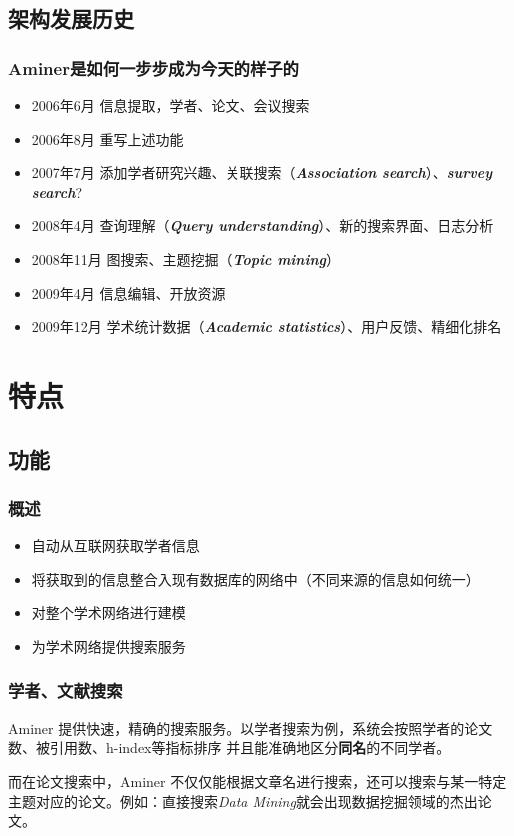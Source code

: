 \documentclass[UTF8]{ctexbeamer}
\begin{document}
\subsection{架构发展历史}
\begin{frame}
    \frametitle{Aminer是如何一步步成为今天的样子的}
    \begin{itemize}
        \item{2006年6月}
              信息提取，学者、论文、会议搜索
        \item{2006年8月}
              重写上述功能
        \item{2007年7月}
              添加学者研究兴趣、关联搜索（\textbf{\textit{Association search}}）、\textbf{\textit{survey search}}?
        \item{2008年4月}
              查询理解（\textbf{\textit{Query understanding}}）、新的搜索界面、日志分析
        \item{2008年11月}
              图搜索、主题挖掘（\textbf{\textit{Topic mining}}）
        \item{2009年4月}
              信息编辑、开放资源
        \item{2009年12月}
              学术统计数据（\textbf{\textit{Academic statistics}}）、用户反馈、精细化排名
    \end{itemize}

\end{frame}

\section{特点}
\frame{\sectionpage}

\subsection{功能}
\begin{frame}
    \frametitle{概述}

    \begin{itemize}
        \item 自动从互联网获取学者信息
        \item 将获取到的信息整合入现有数据库的网络中（不同来源的信息如何统一）
        \item 对整个学术网络进行建模
        \item 为学术网络提供搜索服务
    \end{itemize}

\end{frame}
\begin{frame}
    \frametitle{学者、文献搜索}

    Aminer 提供快速，精确的搜索服务。以学者搜索为例，系统会按照学者的论文数、被引用数、h-index等指标排序
    并且能准确地区分\textbf{同名}的不同学者。

    而在论文搜索中，Aminer 不仅仅能根据文章名进行搜索，还可以搜索与某一特定主题对应的论文。例如：直接搜索\textit{Data
        Mining}就会出现数据挖掘领域的杰出论文。

\end{frame}
\end{document}
